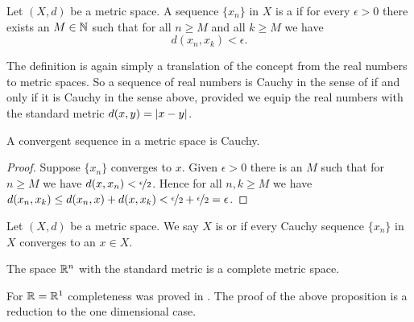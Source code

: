 \begin{defn}
Let $(X,d)$ be a metric space.
A sequence $\{ x_n \}$ in $X$ is a \emph{} if
for every $\epsilon > 0$ there exists an $M \in {\mathbb{N}}$ such that
for all $n \geq M$ and all $k \geq M$ we have
\begin{equation*}
d(x_n, x_k) < \epsilon .
\end{equation*}
\end{defn}

The definition is again simply a translation of the concept
from the real numbers to metric spaces.  So a sequence of real
numbers is Cauchy in the sense of  if and only if
it is Cauchy in the sense above, provided we equip the real numbers with
the standard metric $d(x,y) = \left\lvert {x-y} \right\rvert$.

\begin{prop}
A convergent sequence in a metric space is Cauchy.
\end{prop}

\begin{proof}
Suppose $\{ x_n \}$ converges to $x$.
Given $\epsilon > 0$ there is an $M$ such that for $n \geq M$
we have $d(x,x_n) < \nicefrac{\epsilon}{2}$.  Hence
for all $n,k \geq M$ we have
$d(x_n,x_k) \leq d(x_n,x) + d(x,x_k) < \nicefrac{\epsilon}{2} +
\nicefrac{\epsilon}{2} = \epsilon$.
\end{proof}

\begin{defn}
Let $(X,d)$ be a metric space.  We say $X$ is
\emph{} or \emph{}
if every Cauchy sequence $\{ x_n \}$ in $X$
converges to an $x \in X$.
\end{defn}

\begin{prop}
The space ${\mathbb{R}}^n$ with the standard metric is a complete metric space.
\end{prop}

For ${\mathbb{R}} = {\mathbb{R}}^1$ completeness was proved in .  The proof of
the above proposition is a reduction to the one dimensional case.

